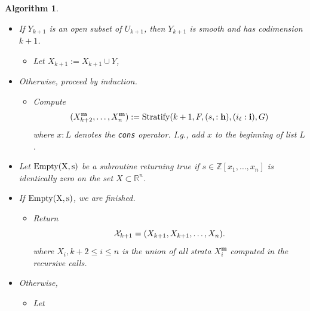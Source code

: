 \documentclass[
]{book}
\providecommand{\tightlist}{%
  \setlength{\itemsep}{0pt}\setlength{\parskip}{0pt}}
\newtheorem{algorithm}{Algorithm}
\theoremstyle{definition}
\theoremstyle{definition}
\theoremstyle{definition}
\theoremstyle{definition}
\theoremstyle{remark}
\begin{document}
\begin{algorithm}
\begin{itemize}
\begin{itemize}
\begin{itemize}
\begin{itemize}
        \begin{itemize}
        \tightlist
        \item
          Clearly \(Y_{k+1} \subset X'\) and \(Y_{k+1} \subset U_{k+1}\)
        \item
          \(h_{k+1}(\mathbf{x}) = 0\) for all \(\mathbf{x} \in Y_{k+1}\).
        \item
          \(U_{k+1}\) is a nonsingular subset of \(\mathbb{R}^n\) having codimension \(k+1\).
        \end{itemize}
      \item
        If \(Y_{k+1}\) is an open subset of \(U_{k+1}\), then \(Y_{k+1}\) is smooth and has codimension \(k+1\).

        \begin{itemize}
        \tightlist
        \item
          Let \(X_{k+1} := X_{k+1} \cup Y\),
        \end{itemize}
      \item
        Otherwise, proceed by induction.

        \begin{itemize}
        \tightlist
        \item
          Compute
          \[(X^{\mathbf{m}}_{k+2},\ldots,X^{\mathbf{m}}_n) := {\rm Stratify}(k+1, F, (s,:\mathbf{h}), (i_\ell:\mathbf{i}), G)\]
          where \(x:L\) denotes the \texttt{cons} operator. I.g., add \(x\) to the beginning of list \(L\).
        \end{itemize}
      \item
        Let \(\rm{Empty}(X,s)\) be a subroutine returning \emph{true} if \(s \in \mathbb{Z}[x_1,\ldots,x_n]\) is identically zero on the set \(X \subset \mathbb{R}^n\).
      \item
        If \(\rm{Empty}(X,s)\), we are finished.

        \begin{itemize}
        \tightlist
        \item
          Return
          \[{\cal X}_{k+1} = (X_{k+1}, X_{k+1}, \ldots, X_n).\]
          where \(X_i, k+2\le i \le n\) is the union of all strata \(X^{\mathbf{m}}_i\) computed in the recursive calls.
        \end{itemize}
      \item
        Otherwise,

        \begin{itemize}
        \item
          Let


\end{itemize}
\end{itemize}
\end{itemize}
\end{itemize}
\end{itemize}
\end{algorithm}
\end{document}
